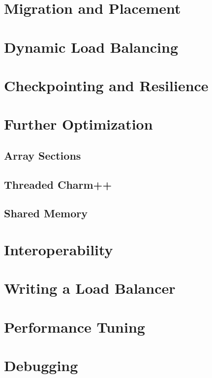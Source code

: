 \documentclass{beamer}
\begin{document}
\section[PUP and Placement]{Migration and Placement}

\section[LB]{Dynamic Load Balancing}

\section[Fault Tol]{Checkpointing and Resilience}


\section[Messages, Groups, Shared Mem]{Further Optimization}

\subsection[Array Sections]{Array Sections}

\subsection[Threaded]{Threaded Charm++}

\subsection{Shared Memory}

\section[AMPI & Interop]{Interoperability}

\section[Custom LB]{Writing a Load Balancer}

\section[Tuning]{Performance Tuning}

\section[Debugging]{Debugging}


\end{document}
